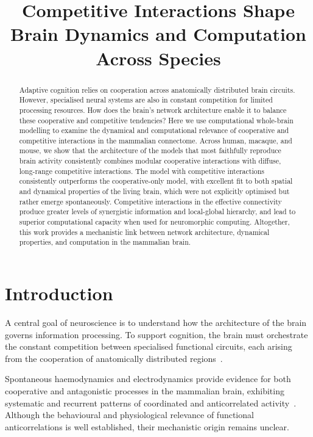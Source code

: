 \documentclass[11pt]{article}
\title{Competitive Interactions Shape Brain Dynamics and Computation Across Species}
\author{}
\date{}
\begin{document}
\maketitle

\begin{abstract}
Adaptive cognition relies on cooperation across anatomically distributed brain circuits. However, specialised neural systems are also in constant competition for limited processing resources. How does the brain's network architecture enable it to balance these cooperative and competitive tendencies? Here we use computational whole-brain modelling to examine the dynamical and computational relevance of cooperative and competitive interactions in the mammalian connectome. Across human, macaque, and mouse, we show that the architecture of the models that most faithfully reproduce brain activity consistently combines modular cooperative interactions with diffuse, long-range competitive interactions. The model with competitive interactions consistently outperforms the cooperative-only model, with excellent fit to both spatial and dynamical properties of the living brain, which were not explicitly optimised but rather emerge spontaneously. Competitive interactions in the effective connectivity produce greater levels of synergistic information and local-global hierarchy, and lead to superior computational capacity when used for neuromorphic computing. Altogether, this work provides a mechanistic link between network architecture, dynamical properties, and computation in the mammalian brain.
\end{abstract}

\section{Introduction}

A central goal of neuroscience is to understand how the architecture of the brain governs information processing. To support cognition, the brain must orchestrate the constant competition between specialised functional circuits, each arising from the cooperation of anatomically distributed regions~\citep{deco2013dynamic,dehaene2011experimental,watanabe2012competitive,mashour2020conscious}.

Spontaneous haemodynamics and electrodynamics provide evidence for both cooperative and antagonistic processes in the mammalian brain, exhibiting systematic and recurrent patterns of coordinated and anticorrelated activity~\citep{fox2005human,popa2022functional}. Although the behavioural and physiological relevance of functional anticorrelations is well established, their mechanistic origin remains unclear.
\end{document}
